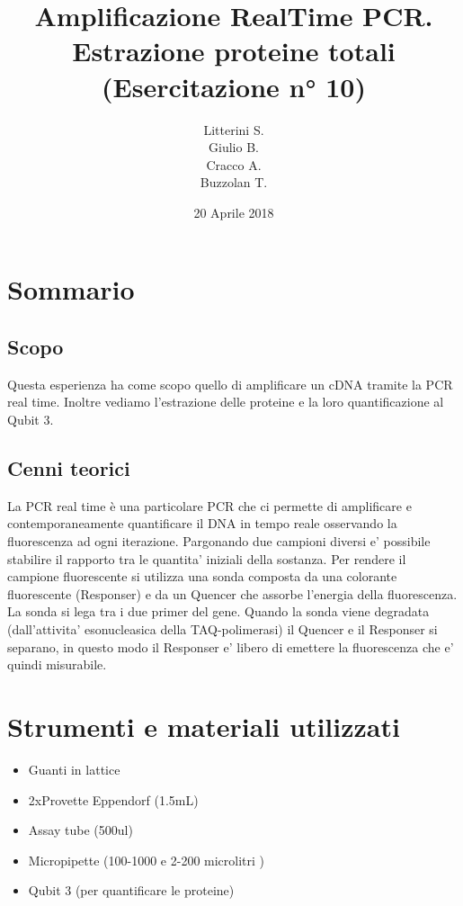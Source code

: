 \documentclass{article}
\title{Amplificazione RealTime PCR. Estrazione proteine totali \\ (Esercitazione n° 10)} %
\author{Litterini S. \\Giulio B. \\Cracco A.\\Buzzolan T. } %
\date{20 Aprile 2018} %
\begin{document}
\maketitle


\section{Sommario}

\subsection{Scopo}


Questa esperienza ha come scopo quello di amplificare un cDNA tramite la PCR real time. Inoltre vediamo l'estrazione delle proteine e la loro quantificazione al Qubit 3.


\subsection{Cenni teorici}

La PCR real time è una particolare PCR che ci permette di amplificare e
contemporaneamente quantificare il DNA in tempo reale osservando la fluorescenza ad ogni iterazione.
Pargonando due campioni diversi e' possibile stabilire il rapporto tra le quantita' iniziali della sostanza.
Per rendere il campione fluorescente si utilizza una sonda composta da una colorante
fluorescente (Responser) e da un Quencer che assorbe l'energia della fluorescenza.
La sonda si lega tra i due primer del gene.
Quando la sonda viene degradata (dall'attivita' esonucleasica della TAQ-polimerasi)
il Quencer e il Responser si separano, in questo modo il Responser e' libero di emettere
la fluorescenza che e' quindi misurabile.

\section{Strumenti e materiali utilizzati}

\begin{itemize}
\item Guanti in lattice
\item 2xProvette Eppendorf (1.5mL)
\item Assay tube (500ul)
\item Micropipette (100-1000  e 2-200 microlitri  )
\item Qubit 3 (per quantificare le proteine)
\end{itemize}
\end{document}

